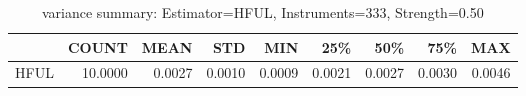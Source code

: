 \begin{table}[ht]
\centering
\caption{variance summary: Estimator=HFUL, Instruments=333, Strength=0.50}
\begin{tabular}{lrrrrrrrr}
\toprule
 & COUNT & MEAN & STD & MIN & 25\% & 50\% & 75\% & MAX \\
\midrule
HFUL & 10.0000 & 0.0027 & 0.0010 & 0.0009 & 0.0021 & 0.0027 & 0.0030 & 0.0046 \\
\bottomrule
\end{tabular}
\end{table}

